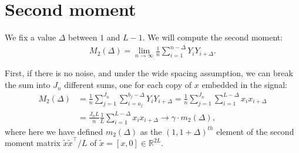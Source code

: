 \documentclass{article}
\theoremstyle{thm}
\theoremstyle{definition}
\begin{document}
\begin{comment}

Actually, what Tamir meant when he said first moment was the average of the windows' averages (a scalar), not the average window (a vector). But this also converges a.s.\ to $\gamma \cdot \bar{x}$, by simply exchanging limits and finite sums, as follows. The sample mean of the window starting at index $i$ is just $\frac{1}{L} \sum_{k=0}^{L-1} Y_{i+k}$. Averaging these over all $n$ windows and taking the limit as $n \to \infty$ we get:
%
\begin{align}
%
    \lim_{n\to\infty} \frac{1}{n} \sum_{i=1}^n \frac{1}{L} \sum_{k=0}^{L-1} Y_{i+k}
    =  \frac{1}{L} \sum_{k=0}^{L-1} \lim_{n\to\infty} \frac{1}{n} \sum_{i=1}^n Y_{i+k}
    = \gamma \cdot \bar{x}.
%
\end{align}

\end{comment}

%
%
%

\section{Second moment}

We fix a value $\Delta$ between $1$ and $L-1$. We will compute the second moment:
%
\begin{align}
%
    M_2(\Delta) = 
        \lim_{n \to \infty} \frac{1}{n} \sum_{i=1}^{n-\Delta} Y_i Y_{i+\Delta}.
%
\end{align}

First, if there is no noise, and under the wide spacing assumption, we can break the sum into $J_n$ different sums, one for each copy of $x$ embedded in the signal:
%
\begin{align}
%
    M_2(\Delta) 
        &= \frac{1}{n} \sum_{j=1}^{J_n} \sum_{i=a_j}^{b_j-\Delta} Y_i Y_{i+\Delta}
        = \frac{1}{n} \sum_{j=1}^{J_n} \sum_{i=1}^{L-\Delta} x_i x_{i+\Delta}
    \nonumber \\
    &= \frac{J_n L}{n} \frac{1}{L} \sum_{i=1}^{L-\Delta} x_i x_{i+\Delta}
    \to \gamma \cdot m_2(\Delta),
%
\end{align}
%
where here we have defined $m_2(\Delta)$ as the $(1,1+\Delta)^{th}$ element of the second moment matrix $\tilde{x} \tilde{x}^\top / L$ of $\tilde{x} = [x,0] \in \mathbb{R}^{2L}$.
\end{document}
